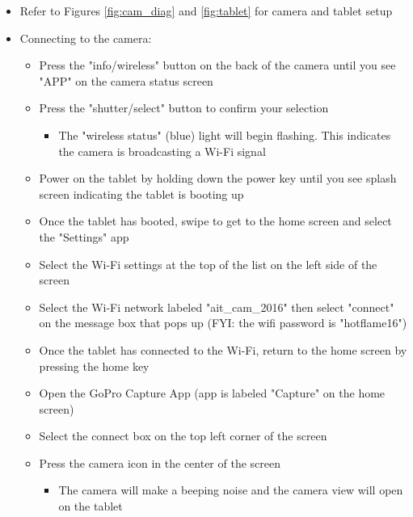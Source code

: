 \documentclass[letterpaper,11pt]{article}
\begin{document}
\begin{itemize}
    \item Refer to Figures \ref{fig:cam_diag} and \ref{fig:tablet} for camera 
        and tablet setup
    \item Connecting to the camera:
        \begin{itemize}
        \item Press the "info/wireless" button on the back of the camera until 
            you see "APP" on the camera status screen
        \item Press the "shutter/select" button to confirm your selection
            \begin{itemize}
            \item The "wireless status" (blue) light will begin flashing. This 
                indicates the camera is broadcasting a Wi-Fi signal 
            \end{itemize}
        \item Power on the tablet by holding down the power key until you see 
            splash screen indicating the tablet is booting up
        \item Once the tablet has booted, swipe to get to the home screen and 
            select the "Settings" app
        \item Select the Wi-Fi settings at the top of the list on the left side 
            of the screen
        \item Select the Wi-Fi network labeled "ait\_cam\_2016" then select 
            "connect" on the message box that pops up (FYI: the wifi password is
            "hotflame16")
        \item Once the tablet has connected to the Wi-Fi, return to the home 
            screen by pressing the home key
        \item Open the GoPro Capture App (app is labeled "Capture" on the home 
            screen) %
        \item Select the connect box on the top left corner of the screen
        \item Press the camera icon in the center of the screen
            \begin{itemize}
            \item The camera will make a beeping noise and the camera view will 
                open on the tablet
            \end{itemize}
        \end{itemize}
    

\end{itemize}
\end{document}
